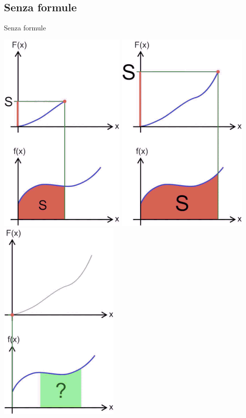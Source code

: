 \documentclass[8pt]{beamer}
\begin{document}
\subsection{Senza formule}
\begin{frame}{Senza formule}
  \begin{center}
    \includegraphics[scale=.2]{Z-158.png}
    \includegraphics[scale=.2]{Z-170.png}
    \includegraphics[scale=.2]{Z-242.png}

\end{center}
\end{frame}
\end{document}
